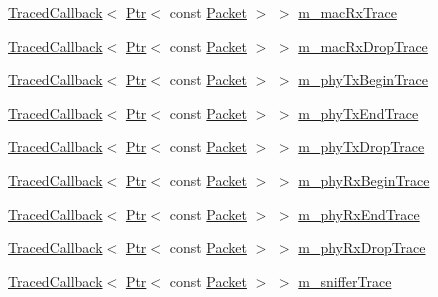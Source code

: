 \begin{DoxyCompactItemize}
\hyperlink{classns3_1_1TracedCallback}{Traced\+Callback}$<$ \hyperlink{classns3_1_1Ptr}{Ptr}$<$ const \hyperlink{classns3_1_1Packet}{Packet} $>$ $>$ \hyperlink{classns3_1_1PointToPointNetDevice_a1b4ac13e16c7028bbb1593f2fca53280}{m\+\_\+mac\+Rx\+Trace}
\item 
\hyperlink{classns3_1_1TracedCallback}{Traced\+Callback}$<$ \hyperlink{classns3_1_1Ptr}{Ptr}$<$ const \hyperlink{classns3_1_1Packet}{Packet} $>$ $>$ \hyperlink{classns3_1_1PointToPointNetDevice_a1d633e87fb40bb21f4da7cd9c72ac17f}{m\+\_\+mac\+Rx\+Drop\+Trace}
\item 
\hyperlink{classns3_1_1TracedCallback}{Traced\+Callback}$<$ \hyperlink{classns3_1_1Ptr}{Ptr}$<$ const \hyperlink{classns3_1_1Packet}{Packet} $>$ $>$ \hyperlink{classns3_1_1PointToPointNetDevice_aa75567144b7715713970bb575ebd26cf}{m\+\_\+phy\+Tx\+Begin\+Trace}
\item 
\hyperlink{classns3_1_1TracedCallback}{Traced\+Callback}$<$ \hyperlink{classns3_1_1Ptr}{Ptr}$<$ const \hyperlink{classns3_1_1Packet}{Packet} $>$ $>$ \hyperlink{classns3_1_1PointToPointNetDevice_ad24afff2bade80cd2e2b952117f3945a}{m\+\_\+phy\+Tx\+End\+Trace}
\item 
\hyperlink{classns3_1_1TracedCallback}{Traced\+Callback}$<$ \hyperlink{classns3_1_1Ptr}{Ptr}$<$ const \hyperlink{classns3_1_1Packet}{Packet} $>$ $>$ \hyperlink{classns3_1_1PointToPointNetDevice_a66a13667106d35d2cbf70c166617c660}{m\+\_\+phy\+Tx\+Drop\+Trace}
\item 
\hyperlink{classns3_1_1TracedCallback}{Traced\+Callback}$<$ \hyperlink{classns3_1_1Ptr}{Ptr}$<$ const \hyperlink{classns3_1_1Packet}{Packet} $>$ $>$ \hyperlink{classns3_1_1PointToPointNetDevice_aca46a6ee3f8778f9cf13ddd55efc59fa}{m\+\_\+phy\+Rx\+Begin\+Trace}
\item 
\hyperlink{classns3_1_1TracedCallback}{Traced\+Callback}$<$ \hyperlink{classns3_1_1Ptr}{Ptr}$<$ const \hyperlink{classns3_1_1Packet}{Packet} $>$ $>$ \hyperlink{classns3_1_1PointToPointNetDevice_a087003567f5836b7dafda69423dda203}{m\+\_\+phy\+Rx\+End\+Trace}
\item 
\hyperlink{classns3_1_1TracedCallback}{Traced\+Callback}$<$ \hyperlink{classns3_1_1Ptr}{Ptr}$<$ const \hyperlink{classns3_1_1Packet}{Packet} $>$ $>$ \hyperlink{classns3_1_1PointToPointNetDevice_a8c980fe1c80f3e7c084e489e0176aeda}{m\+\_\+phy\+Rx\+Drop\+Trace}
\item 
\hyperlink{classns3_1_1TracedCallback}{Traced\+Callback}$<$ \hyperlink{classns3_1_1Ptr}{Ptr}$<$ const \hyperlink{classns3_1_1Packet}{Packet} $>$ $>$ \hyperlink{classns3_1_1PointToPointNetDevice_ae62def3355a42b37b41f7d59dc81bb0e}{m\+\_\+sniffer\+Trace}

\end{DoxyCompactItemize}
